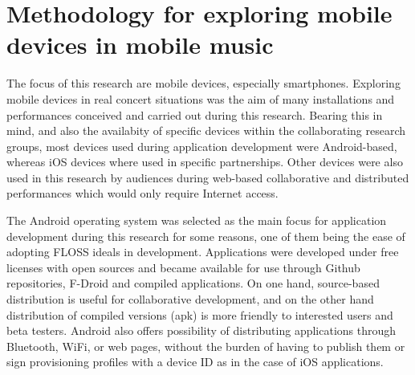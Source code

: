 


\section{Methodology for exploring mobile devices in mobile music}

The focus of this research are mobile devices, especially smartphones.
Exploring mobile devices in real concert situations was the aim of many installations and performances conceived and carried out during this research.
Bearing this in mind, and also the availabity of specific devices within the collaborating research groups, most devices used during application development were Android-based, whereas iOS devices where used in specific partnerships.
Other devices were also used in this research by audiences during web-based collaborative and distributed performances which would only require Internet access. 



The Android operating system was selected as the main focus for application development during this research for some reasons, one of them being the ease of adopting FLOSS ideals in development.
Applications were developed under free licenses with open sources and became available for use through Github repositories, F-Droid and compiled applications. On one hand, source-based distribution is useful for collaborative development, and on the other hand distribution of compiled versions (apk) is more friendly to interested users and beta testers.
Android also offers possibility of distributing applications through Bluetooth, WiFi, or web pages, without the burden of having to publish them or sign provisioning profiles with a device ID as in the case of iOS applications.

